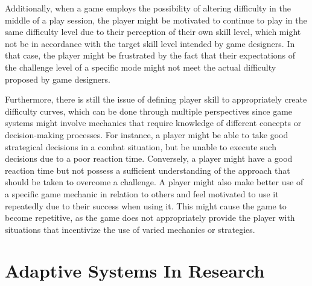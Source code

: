 Additionally, when a game employs the possibility of altering difficulty in the middle of a play session, the player might be motivated to continue to play in the same difficulty level due to their perception of their own skill level, which might not be in accordance with the target skill level intended by game designers. In that case, the player might be frustrated by the fact that their expectations of the challenge level of a specific mode might not meet the actual difficulty proposed by game designers.

Furthermore, there is still the issue of defining player skill to appropriately create difficulty curves, which can be done through multiple perspectives since game systems might involve mechanics that require knowledge of different concepts or decision-making processes. For instance, a player might be able to take good strategical decisions in a combat situation, but be unable to execute such decisions due to a poor reaction time. Conversely, a player might have a good reaction time but not possess a sufficient understanding of the approach that should be taken to overcome a challenge. A player might also make better use of a specific game mechanic in relation to others and feel motivated to use it repeatedly due to their success when using it. This might cause the game to become repetitive, as the game does not appropriately provide the player with situations that incentivize the use of varied mechanics or strategies.


\section{Adaptive Systems In Research}

